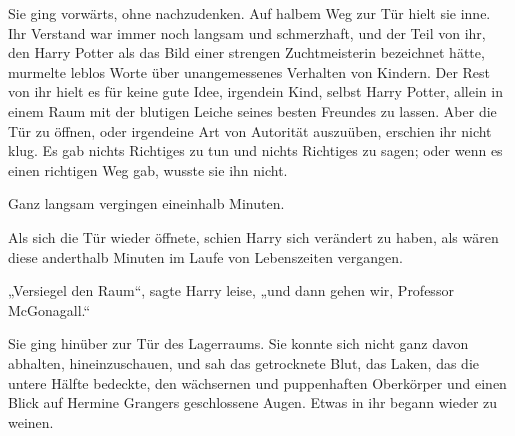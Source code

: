 Sie ging vorwärts, ohne nachzudenken. Auf halbem Weg zur Tür hielt sie inne. Ihr Verstand war immer noch langsam und schmerzhaft, und der Teil von ihr, den Harry Potter als das Bild einer strengen Zuchtmeisterin bezeichnet hätte, murmelte leblos Worte über unangemessenes Verhalten von Kindern. Der Rest von ihr hielt es für keine gute Idee, irgendein Kind, selbst Harry Potter, allein in einem Raum mit der blutigen Leiche seines besten Freundes zu lassen. Aber die Tür zu öffnen, oder irgendeine Art von Autorität auszuüben, erschien ihr nicht klug. Es gab nichts Richtiges zu tun und nichts Richtiges zu sagen; oder wenn es einen richtigen Weg gab, wusste sie ihn nicht.

Ganz langsam vergingen eineinhalb Minuten.

 \later

Als sich die Tür wieder öffnete, schien Harry sich verändert zu haben, als wären diese anderthalb Minuten im Laufe von Lebenszeiten vergangen.

„Versiegel den Raum“, sagte Harry leise, „und dann gehen wir, Professor McGonagall.“

Sie ging hinüber zur Tür des Lagerraums. Sie konnte sich nicht ganz davon abhalten, hineinzuschauen, und sah das getrocknete Blut, das Laken, das die untere Hälfte bedeckte, den wächsernen und puppenhaften Oberkörper und einen Blick auf Hermine Grangers geschlossene Augen. Etwas in ihr begann wieder zu weinen.

